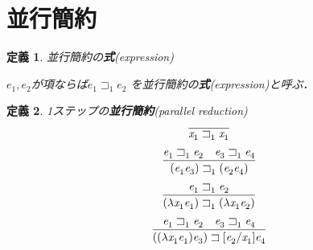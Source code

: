 \documentclass{ltjsbook}%
\newtheorem{definition}{定義}[section]%
\newcommand\term[2]{\textbf{#1}{(\textit{#2})}}%
\begin{document}
\section{並行簡約}%
\label{sect:par}%
\begin{definition}%
並行簡約の\term{式}{expression}%
\par$\mathit{e}_1^{},\mathit{e}_2^{}$が項ならば$\mathit{e}_1^{}\sqsupset_1^{}\mathit{e}_2^{}$%
を並行簡約の\term{式}{expression}と呼ぶ．%
\end{definition}%
\begin{definition}%
1ステップの\term{並行簡約}{parallel reduction}%
\begin{equation}%
  \infer{%
    \mathit{x}_1^{}\sqsupset_1^{}\mathit{x}_1^{}%
  }{%
  }%
\end{equation}%
\begin{equation}%
  \infer{%
    (\mathit{e}_1^{}\mathit{e}_3^{})\sqsupset_1^{}(\mathit{e}_2^{}\mathit{e}_4^{})%
  }{%
    \mathit{e}_1^{}\sqsupset_1^{}\mathit{e}_2^{}%
  &%
    \mathit{e}_3^{}\sqsupset_1^{}\mathit{e}_4^{}%
  }%
\end{equation}%
\begin{equation}%
  \infer{%
    (\lambda\mathit{x}_1^{}\mathit{e}_1^{})\sqsupset_1^{}%
    (\lambda\mathit{x}_1^{}\mathit{e}_2^{})%
  }{%
    \mathit{e}_1^{}\sqsupset_1^{}\mathit{e}_2^{}%
  }%
\end{equation}%
\begin{equation}%
  \infer{%
    ((\lambda\mathit{x}_1^{}\mathit{e}_1^{})\mathit{e}_3^{})\sqsupset%
    [\mathit{e}_2^{}/\mathit{x}_1^{}]\mathit{e}_4^{}%
  }{%
    \mathit{e}_1^{}\sqsupset_1^{}\mathit{e}_2^{}%
  &%
    \mathit{e}_3^{}\sqsupset_1^{}\mathit{e}_4^{}%
  }%
\end{equation}%
\end{definition}%
\end{document}
